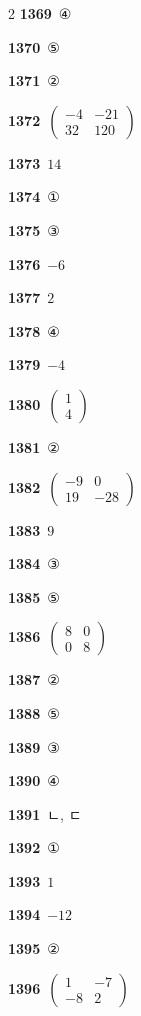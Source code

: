 \documentclass[10pt,a4paper]{article}
\begin{document}
\begin{multicols}{2}
\noindent\textbf{1369}\ ④\par
\noindent\textbf{1370}\ ⑤\par
\noindent\textbf{1371}\ ②\par
\noindent\textbf{1372}\ $\begin{pmatrix} -4 & -21 \\ 32 & 120 \end{pmatrix}$\par
\noindent\textbf{1373}\ $14$\par
\noindent\textbf{1374}\ ①\par
\noindent\textbf{1375}\ ③\par
\noindent\textbf{1376}\ $-6$\par
\noindent\textbf{1377}\ $2$\par
\noindent\textbf{1378}\ ④\par
\noindent\textbf{1379}\ $-4$\par
\noindent\textbf{1380}\ $\begin{pmatrix} 1 \\ 4 \end{pmatrix}$\par
\noindent\textbf{1381}\ ②\par
\noindent\textbf{1382}\ $\begin{pmatrix} -9 & 0 \\ 19 & -28 \end{pmatrix}$\par
\noindent\textbf{1383}\ $9$\par
\noindent\textbf{1384}\ ③\par
\noindent\textbf{1385}\ ⑤\par
\noindent\textbf{1386}\ $\begin{pmatrix} 8 & 0 \\ 0 & 8 \end{pmatrix}$\par
\noindent\textbf{1387}\ ②\par
\noindent\textbf{1388}\ ⑤\par
\noindent\textbf{1389}\ ③\par
\noindent\textbf{1390}\ ④\par
\noindent\textbf{1391}\ ㄴ, ㄷ\par
\noindent\textbf{1392}\ ①\par
\noindent\textbf{1393}\ $1$\par
\noindent\textbf{1394}\ $-12$\par
\noindent\textbf{1395}\ ②\par
\noindent\textbf{1396}\ $\begin{pmatrix} 1 & -7 \\ -8 & 2 \end{pmatrix}$\par

\end{multicols}
\end{document}

